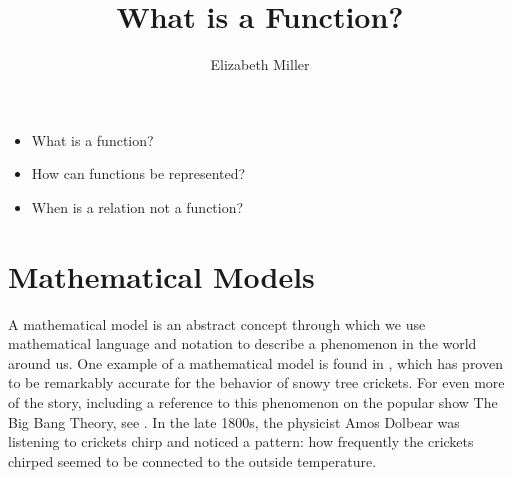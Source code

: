 \documentclass{ximera}
\author{Elizabeth Miller}
\title{What is a Function?}
\begin{document}
\begin{abstract}
  
\end{abstract}
\maketitle



\begin{motivatingQuestions}\begin{itemize}
\item What is a function?
\item How can functions be represented?
\item When is a relation not a function?
\end{itemize}\end{motivatingQuestions}



\section{Mathematical Models}
A mathematical model is an abstract concept through which we use mathematical language and notation to describe a phenomenon in the world around us.  One example of a mathematical model is found in , which has proven to be remarkably accurate for the behavior of snowy tree crickets.  For even more of the story, including a reference to this phenomenon on the popular show The Big Bang Theory, see .  In the late 1800s, the physicist Amos Dolbear was listening to crickets chirp and noticed a pattern: how frequently the crickets chirped seemed to be connected to the outside temperature.  
\end{document}
